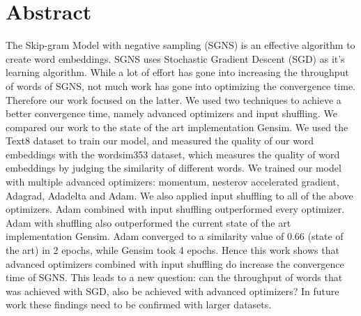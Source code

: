 \chapter*{Abstract}
The Skip-gram Model with negative sampling (SGNS) is an effective algorithm to create word embeddings. SGNS  uses Stochastic Gradient Descent (SGD) as it's learning algorithm. While a lot of effort has gone into increasing the throughput of words of SGNS, not much work has gone into optimizing the convergence time. Therefore our work focused on the latter. We used two techniques to achieve a better convergence time, namely advanced optimizers and input shuffling. We compared our work to the state of the art implementation Gensim. We used the Text8 dataset to train our model, and measured the quality of our word embeddings with the wordsim353 dataset, which measures the quality of word embeddings by judging the similarity of different words. We trained our model with multiple advanced optimizers: momentum, nesterov accelerated gradient, Adagrad, Adadelta and Adam. We also applied input shuffling to all of the above optimizers. Adam combined with input shuffling outperformed every optimizer. Adam with shuffling also outperformed the current state of the art implementation Gensim. Adam converged to a similarity value of 0.66 (state of the art) in 2 epochs, while Gensim took 4 epochs. Hence this work shows that advanced optimizers combined with input shuffling do increase the convergence time of SGNS. This leads to a new question: can the throughput of words that was achieved with SGD, also be achieved with advanced optimizers? In future work these findings need to be confirmed with larger datasets.
